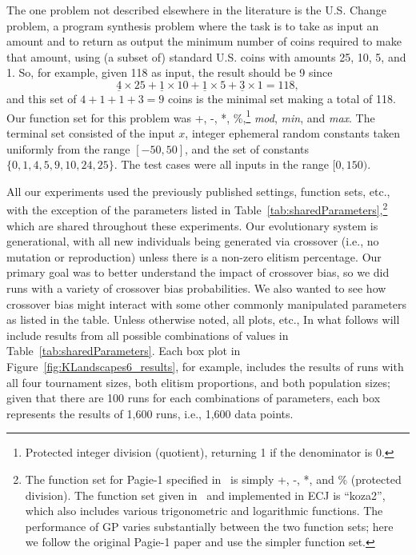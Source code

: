 \documentclass{sig-alternate}
\begin{document}
The one problem not described elsewhere in the literature is the U.S. Change problem, a program 
synthesis problem where the task is to take as input an amount and to return as output the minimum 
number of coins required to make that amount, using (a subset of) standard U.S. coins with amounts 
25, 10, 5, and 1. So, for example, given 118 as input, the result should be 9 since 
\[
	\underline{4} \times 25 + \underline{1} \times 10 + \underline{1} \times 5 + \underline{3} \times 1 = 118,
\]
and this set of $4+1+1+3 = 9$ coins is the minimal set 
making a total of 118. Our function set for this problem was +, -, *, \%,\footnote{Protected integer 
division (quotient), returning 1 if the denominator is 0.} \emph{mod}, \emph{min}, and \emph{max}. 
The terminal set consisted of the input $x$, integer ephemeral random constants taken uniformly 
from the range $[-50, 50]$, and the set of constants $\{ 0, 1, 4, 5, 9, 10, 24, 25 \}$. The test cases 
were all inputs in the range $[0, 150)$.



All our experiments used the previously published
settings, function sets, etc., with the exception of the parameters listed in 
Table~\ref{tab:sharedParameters},\footnote{The function 
set for Pagie-1 specified in~\cite{pagie1997evolutionary} is simply +, -, *, and \% (protected division). 
The function set given in~\cite{mcdermott2012genetic} and implemented in ECJ is ``koza2'', which 
also includes various trigonometric and logarithmic functions. The performance of GP varies 
substantially between the two function sets; here we follow the original Pagie-1 paper and use the 
simpler function set.} which are shared throughout these experiments. Our evolutionary system is 
generational, with all new individuals being generated via crossover (i.e., no mutation or reproduction) 
unless there is a non-zero elitism percentage. Our primary goal was to better understand the 
impact of crossover bias, so we did runs with a variety of crossover bias probabilities. We also 
wanted to see how crossover bias might interact with some other commonly manipulated parameters 
as listed in the table. Unless otherwise noted, all plots, etc., In what follows will include results from 
all possible combinations of values in Table~\ref{tab:sharedParameters}. Each box plot in 
Figure~\ref{fig:KLandscapes6_results}, for example, includes the results of runs with all four 
tournament sizes, both elitism proportions, and both population sizes; given that there are 100 runs 
for each combinations of parameters, each box represents the results of 1,600 runs, i.e., 1,600 data points.
\end{document}
